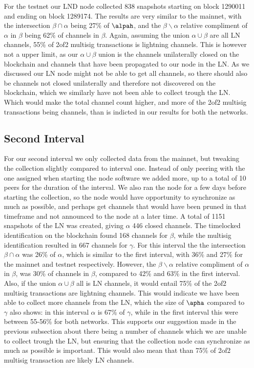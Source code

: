 For the testnet our LND node collected 838 snapshots starting on block 1290011 and ending on block 1289174. The results are very similar to the mainnet, with the intersection $\beta \cap \alpha$ being 27\% of $\alpah$,
and the $\beta \backslash{} \alpha$ relative compliment of $\alpha$ in $\beta$ being 62\% of channels in $\beta$.
Again, assuming the union $\alpha \cup \beta$ are all LN channels, 55\% of 2of2 multisig transactions is lightning channels. This is however not a upper limit, as our $\alpha \cup \beta$ union is the channels unilaterally closed on the blockchain and channels that have been propagated to our node in the LN. As we discussed our LN node might not be able to get all channels, so there should also be channels not closed unilaterally and therefore not discovered on the blockchain, which we similarly have not been able to collect trough the LN. 
Which would make the total channel count higher, and more of the 2of2 multisig transactions being channels, than is indicted in our results for both the networks.

\subsection{Second Interval}


For our second interval we only collected data from the mainnet, but tweaking the collection slightly compared to interval one. Instead of only peering with the one assigned when starting the node software we added more, up to a total of 10 peers for the duration of the interval. We also ran the node for a few days before starting the collection, so the node would have opportunity to synchronize as much as possible, and perhaps get channels that would have been pruned in that timeframe and not announced to the node at a later time. A total of 1151 snapshots of the LN was created, giving $\alpha$ 446 closed channels. The timelocked identification on the blockchain found  168 channels for $\beta$, while the multisig identification resulted in 667 channels for $\gamma$. For this interval the the intersection $\beta \cap \alpha$ was 26\% of $\alpha$, which is similar to the first interval, with 36\% and 27\% for the mainnet and testnet respectively. However, the $\beta \backslash{} \alpha$ relative compliment of $\alpha$ in $\beta$, was 30\% of channels in $\beta$, compared to 42\% and 63\% in the first interval. Also, if the union $\alpha \cup \beta$ all is LN channels, it would entail 75\% of the 2of2 multisig transactions are lightning channels. This would indicate we have been able to collect more channels from the LN, which the size of $\apha$ compared to $\gamma$ also shows: in this interval $\alpha$ is 67\% of $\gamma$, while in the first interval this were between 55-56\% for both networks. This supports our suggestion made in the previous subsection about there being a number of channels which we are unable to collect trough the LN, but ensuring that the collection node can synchronize as much as possible is important.
This would also mean that than 75\% of 2of2 multisig transaction are likely LN channels. 

